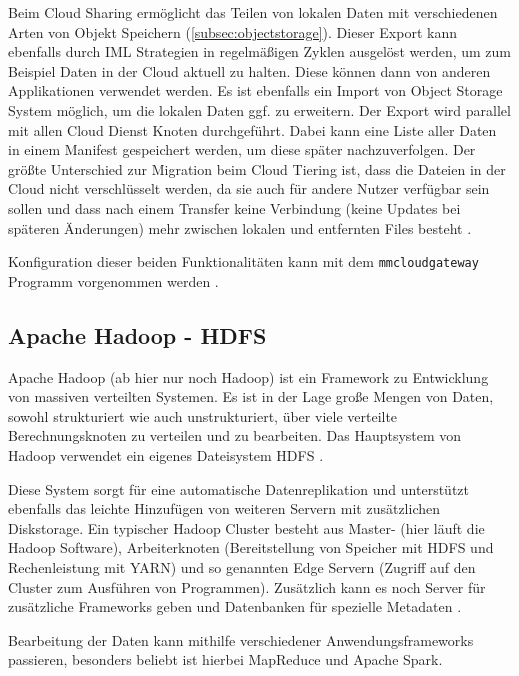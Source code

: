 Beim Cloud Sharing ermöglicht das Teilen von lokalen Daten mit verschiedenen Arten von Objekt Speichern (\autoref{subsec:objectstorage}). Dieser Export kann ebenfalls durch IML Strategien in regelmäßigen Zyklen ausgelöst werden, um zum Beispiel Daten in der Cloud aktuell zu halten. Diese können dann von anderen Applikationen verwendet werden. Es ist ebenfalls ein Import von Object Storage System möglich, um die lokalen Daten ggf. zu erweitern.
Der Export wird parallel mit allen Cloud Dienst Knoten durchgeführt. Dabei kann eine Liste aller Daten in einem Manifest gespeichert werden, um diese später nachzuverfolgen.
Der größte Unterschied zur Migration beim Cloud Tiering ist, dass die Dateien in der Cloud nicht verschlüsselt werden, da sie auch für andere Nutzer verfügbar sein sollen und dass nach einem Transfer keine Verbindung (keine Updates bei späteren Änderungen) mehr zwischen lokalen und entfernten Files besteht \parencite[S. 109]{ibm.2017}.

Konfiguration dieser beiden Funktionalitäten kann mit dem \lstinline|mmcloudgateway| Programm vorgenommen werden \parencite{ibmadmin.2017}.

\subsection{Apache Hadoop - HDFS}

Apache Hadoop (ab hier nur noch Hadoop) ist ein Framework zu Entwicklung von massiven verteilten Systemen. Es ist in der Lage große Mengen von Daten, sowohl strukturiert wie auch unstrukturiert, über viele verteilte Berechnungsknoten zu verteilen und zu bearbeiten. Das Hauptsystem von Hadoop verwendet ein eigenes Dateisystem HDFS \parencite[Kap. I,1]{alapati.2016}.

Diese System sorgt für eine automatische Datenreplikation und unterstützt ebenfalls das leichte Hinzufügen von weiteren Servern mit zusätzlichen Diskstorage. Ein typischer Hadoop Cluster besteht aus Master- (hier läuft die Hadoop Software), Arbeiterknoten (Bereitstellung von Speicher mit HDFS und Rechenleistung mit \ac{YARN}) und so genannten Edge Servern (Zugriff auf den Cluster zum Ausführen von Programmen). Zusätzlich kann es noch Server für zusätzliche Frameworks geben und Datenbanken für spezielle Metadaten \parencite[Kap. I,1]{alapati.2016}.

Bearbeitung der Daten kann mithilfe verschiedener Anwendungsframeworks passieren, besonders beliebt ist hierbei MapReduce und Apache Spark.

